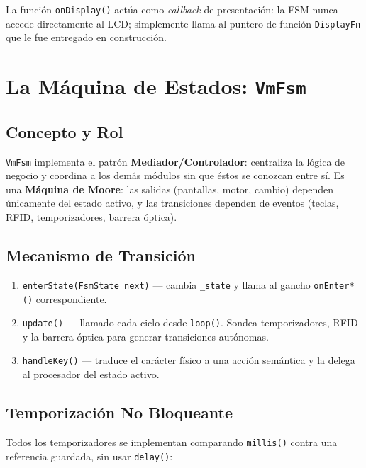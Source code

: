 \documentclass[12pt,a4paper]{article}
\begin{document}
La función \texttt{onDisplay()} actúa como \emph{callback} de presentación:
la FSM nunca accede directamente al LCD; simplemente llama al puntero de
función \texttt{DisplayFn} que le fue entregado en construcción.

\section{La Máquina de Estados: \texttt{VmFsm}}

\subsection{Concepto y Rol}

\texttt{VmFsm} implementa el patrón \textbf{Mediador/Controlador}: centraliza
la lógica de negocio y coordina a los demás módulos sin que éstos se
conozcan entre sí. Es una \textbf{Máquina de Moore}: las salidas (pantallas,
motor, cambio) dependen únicamente del estado activo, y las transiciones
dependen de eventos (teclas, RFID, temporizadores, barrera óptica).

\subsection{Mecanismo de Transición}

\begin{enumerate}
    \item \texttt{enterState(FsmState next)} — cambia \texttt{\_state} y
          llama al gancho \texttt{onEnter*()} correspondiente.
    \item \texttt{update()} — llamado cada ciclo desde \texttt{loop()}.
          Sondea temporizadores, RFID y la barrera óptica para generar
          transiciones autónomas.
    \item \texttt{handleKey()} — traduce el carácter físico a una acción
          semántica y la delega al procesador del estado activo.
\end{enumerate}

\subsection{Temporización No Bloqueante}

Todos los temporizadores se implementan comparando \texttt{millis()} contra
una referencia guardada, sin usar \texttt{delay()}:
\end{document}
